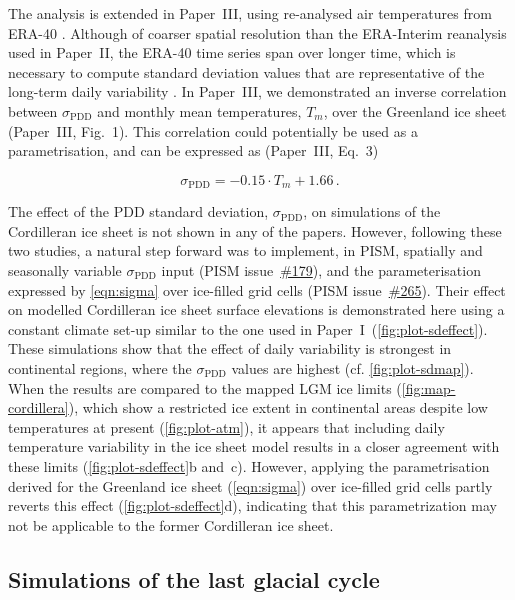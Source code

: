 \documentclass[a4paper]{kappa}
\newcommand{\sPDD}[0]{\sigma_{\mathrm{PDD}}}
\newcommand{\CCLI}[0]{Paper~I}      %
\newcommand{\PSDV}[0]{Paper~II}     %
\newcommand{\PSDP}[0]{Paper~III}    %
\newcommand{\issue}[1]{\href{https://github.com/pism/pism/issues/#1}{\##1}}
\begin{document}
The analysis is extended in \PSDP, using re-analysed air
temperatures from ERA-40 \citep{Uppala.etal.2005}. Although of coarser spatial
resolution than the ERA-Interim reanalysis used in \PSDV, the ERA-40 time
series span over longer time, which is necessary to compute standard deviation
values that are representative of the long-term daily variability
\citep{Rogozhina.Rau.2014}. In \PSDP, we demonstrated an inverse correlation
between $\sPDD$ and monthly mean temperatures, $T_m$, over the Greenland ice
sheet (\PSDP, Fig.~1). This correlation could potentially be used as a
parametrisation, and can be expressed as (\PSDP, Eq.~3)

\begin{equation}
    \label{eqn:sigma}
    \sPDD = -0.15 \cdot T_{m} + 1.66\,.
\end{equation}

The effect of the PDD standard deviation, $\sPDD$, on simulations of the
Cordilleran ice sheet is not shown in any of the papers. However, following
these two studies, a natural step forward was to implement, in PISM, spatially
and seasonally variable $\sPDD$ input (PISM issue~\issue{179}), and the
parameterisation expressed by \cref{eqn:sigma} over ice-filled grid cells
(PISM issue~\issue{265}). Their effect on modelled Cordilleran ice sheet
surface elevations is demonstrated here using a constant climate set-up similar
to the one used in \CCLI\ (\cref{fig:plot-sdeffect}). These simulations show
that the effect of daily variability is strongest in continental regions, where
the $\sPDD$ values are highest (cf. \cref{fig:plot-sdmap}). When the results
are compared to the mapped LGM ice limits (\cref{fig:map-cordillera}), which show
a restricted ice extent in continental areas despite low temperatures at
present (\cref{fig:plot-atm}), it appears that including daily temperature
variability in the ice sheet model results in a closer agreement with these
limits (\cref{fig:plot-sdeffect}b and~c). However, applying the parametrisation
derived for the Greenland ice sheet (\cref{eqn:sigma}) over ice-filled grid
cells partly reverts this effect (\cref{fig:plot-sdeffect}d), indicating that
this parametrization may not be applicable to the former Cordilleran ice sheet.


\subsection{Simulations of the last glacial cycle}
\end{document}
